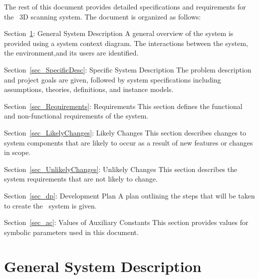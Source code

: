\documentclass[12pt]{article}
\begin{document}
The rest of this document provides detailed specifications and requirements for the \progname\ 3D scanning system. The document is organized as follows:  
  
\noindent \begin{description}
\item Section~\ref{sec_GeneralDesc}: General System Description 
\newline
A general overview of the system is provided using a system context diagram. The interactions between the system, the environment,and its users are identified.
\item Section~\ref{sec_SpecificDesc}: Specific System Description 
\newline 
The problem description and project goals are given, followed by system specifications including assumptions, theories, definitions, and instance models.
\item Section~\ref{sec_Requirements}: Requirements
\newline
This section defines the functional and non-functional requirements of the system.
\item Section~\ref{sec_LikelyChanges}: Likely Changes
\newline
This section describes changes to system components that are likely to occur as a result of new features or changes in scope.
\item Section~\ref{sec_UnlikelyChanges}: Unlikely Changes 
\newline
This section describes the system requirements that are not likely to change.
\item Section~\ref{sec_dp}: Development Plan 
\newline
A plan outlining the steps that will be taken to create the \progname\ system is given.
\item Section~\ref{sec_ac}: Values of Auxiliary Constants 
\newline
This section provides values for symbolic parameters used in this document.
\end{description}

\section{General System Description} 
\label{sec_GeneralDesc}
\end{document}
